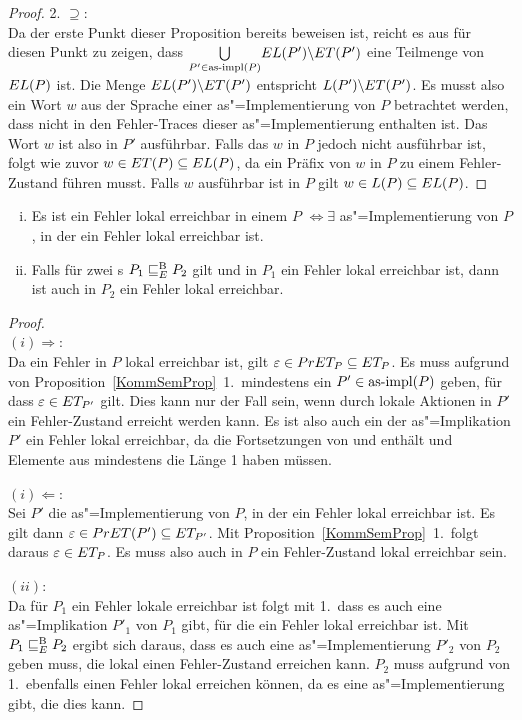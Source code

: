 \begin{proof}
  2. \glqq$\supseteq$\grqq{}:\\
  Da der erste Punkt dieser Proposition bereits beweisen ist, reicht es aus für
  diesen Punkt zu zeigen, dass $\underset{P'\in\mathrm{as}\text{-}\mathrm{impl} (P)}{\bigcup} EL
  (P')\backslash ET (P')$ eine Teilmenge von $EL (P)$ ist. Die Menge $EL
  (P')\backslash ET (P')$ entspricht $L (P') \backslash ET (P')$. Es musst
  also ein Wort $w$ aus der Sprache einer as"=Implementierung von $P$
  betrachtet werden, dass nicht in den Fehler-Traces dieser as"=Implementierung
  enthalten ist. Das Wort $w$ ist also in $P'$ ausführbar. Falls das $w$ in $P$
  jedoch nicht ausführbar ist, folgt wie zuvor $w\in ET (P)\subseteq EL (P)$,
  da ein Präfix von $w$ in $P$ zu einem Fehler-Zustand führen musst. Falls $w$
  ausführbar ist in $P$ gilt $w\in L(P)\subseteq EL (P)$.
\end{proof}

\begin{Kor}\mbox{}
  \label{lokalFehlerErrKor}
  \begin{enumerate}[(i)]
    \item Es ist ein Fehler lokal erreichbar in einem \MEIO{} $P$
      $\Leftrightarrow \exists$ as"=Implementierung von $P$, in der ein Fehler
      lokal erreichbar ist.
    \item Falls für zwei \MEIO{}s $P_1 \sqsubseteq  _E^\mathrm{B} P_2$ gilt und in $P_1$ ein Fehler
      lokal erreichbar ist, dann ist auch in $P_2$ ein Fehler lokal erreichbar.
  \end{enumerate}
\end{Kor}
\begin{proof}\mbox{}\\
  $(i) \Rightarrow$:\\
  Da ein Fehler in $P$ lokal erreichbar ist, gilt $\varepsilon \in PrET _P
  \subseteq ET _P$. Es muss aufgrund von Proposition~\ref{KommSemProp}~1.\
  mindestens ein $P'\in\mathrm{as}\text{-}\mathrm{impl} (P)$ geben, für dass $\varepsilon \in ET _{P'}$
  gilt. Dies kann nur der Fall sein, wenn durch lokale Aktionen in $P'$
  ein Fehler-Zustand erreicht werden kann. Es ist also auch ein der
  as"=Implikation $P'$ ein Fehler lokal erreichbar, da \ET{} die Fortsetzungen
  von \PrET{} und \MIT{} enthält und Elemente aus \MIT{} mindestens die Länge 1
  haben müssen.

  $(i) \Leftarrow$:\\
  Sei $P'$ die as"=Implementierung von $P$, in der ein Fehler lokal erreichbar
  ist. Es gilt dann $\varepsilon\in PrET (P') \subseteq ET _{P'}$. Mit
  Proposition~\ref{KommSemProp}~1.\ folgt daraus $\varepsilon \in ET _P$. Es
  muss also auch in $P$ ein Fehler-Zustand lokal erreichbar sein.

  $(ii)$:\\
  Da für $P_1$ ein Fehler lokale erreichbar ist folgt mit 1.\, dass es auch
  eine as"=Implikation $P'_1$ von $P_1$ gibt, für die ein Fehler lokal
  erreichbar ist. Mit $P_1 \sqsubseteq  _E^\mathrm{B} P_2$ ergibt sich daraus, dass es auch eine
  as"=Implementierung $P'_2$ von $P_2$ geben muss, die lokal einen
  Fehler-Zustand erreichen kann. $P_2$ muss aufgrund von 1.\ ebenfalls einen
  Fehler lokal erreichen können, da es eine as"=Implementierung gibt, die dies
  kann.
\end{proof}

